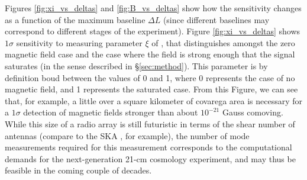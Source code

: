 Figures \ref{fig:xi_vs_deltas} and \ref{fig:B_vs_deltas} show how the sensitivity changes as a function of the maximum baseline $\Delta L$ (since different baselines may correspond to different stages of the experiment). Figure \ref{fig:xi_vs_deltas} shows $1\sigma$ sensitivity to measuring parameter $\xi$ of \eq{\ref{eq:saturated_P}}, that distinguishes amongst the zero magnetic field case and the case where the field is strong enough that the signal saturates (in the sense described in \S\ref{sec:method}). This parameter is by definition boud between the values of 0 and 1, where 0 represents the case of no magnetic field, and 1 represents the saturated case. From this Figure, we can see that, for example, a little over a square kilometer of covarega area is necessary for a $1\sigma$ detection of magnetic fields stronger than about $10^{-21}$ Gauss comoving. While this size of a radio array is still futuristic in terms of the shear number of antennas (compare to the SKA \cite{2008arXiv0802.1727C}, for example), the number of mode measurements required for this measurement corresponds to the computational demands for the next-generation 21-cm cosmology experiment, and may thus be feasible in the coming couple of decades. 

